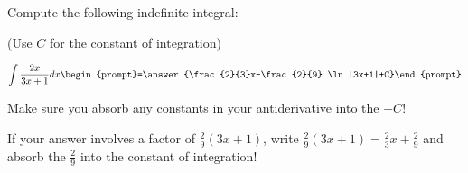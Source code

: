 \documentclass{ximera}
\author{Jim Talamo}
\begin{document}
\begin{exercise}

Compute the following indefinite integral:

\begin{prompt} (Use $C$ for the constant of integration) \end{prompt}

\[
\int \frac{2x}{3x+1} dx 
\begin{prompt}=\answer{\frac{2}{3}x-\frac{2}{9} \ln|3x+1|+C}\end{prompt}
\]

Make sure you absorb any constants in your antiderivative into the $+C$!

\begin{hint}
If your answer involves a factor of $\frac{2}{9}(3x+1)$, write $\frac{2}{9}(3x+1) = \frac{2}{3}x+\frac{2}{9}$ and absorb the $\frac{2}{9}$ into the constant of integration!
\end{hint}

\end{exercise}
\end{document}
